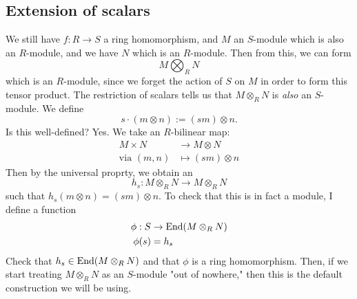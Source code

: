 \documentclass{article}
\begin{document}
\subsection{Extension of scalars}
We still have $f: R \to S$ a ring homomorphism, and $M$ an $S$-module which is also an $R$-module, and we have $N$ which is an $R$-module. Then from this, we can form \[ M \bigotimes_{R} N \] which is an $R$-module, since we forget the action of $S$ on $M$ in order to form this tensor product. The restriction of scalars tells us that $M \otimes_{R} N$ is \textit{also} an $S$-module. \gap We define \[ s \cdot (m \otimes n) := (sm) \otimes n.\] Is this well-defined? Yes. We take an $R$-bilinear map:
\begin{align*}
    M \times N &\to M \otimes N\\
    \text{via} \, \, (m,n) &\mapsto (sm) \otimes n
\end{align*}
Then by the universal proprty, we obtain an \[ h_{s} : M \otimes_{R} N \to M \otimes_{R} N\] such that $h_{s}(m \otimes n) = (sm) \otimes n$. To check that this is in fact a module, I define a function 
\begin{align*}
    \phi : S &\to \operatorname{End}(M \otimes_{R} N)\\
    \phi(s)&=h_{s}
\end{align*}
Check that $h_{s} \in \operatorname{End}(M \otimes_{R} N)$ and that $\phi$ is a ring homomorphism. \gap Then, if we start treating $M \otimes_{R} N$ as an $S$-module "out of nowhere," then this is the default construction we will be using.
\end{document}
